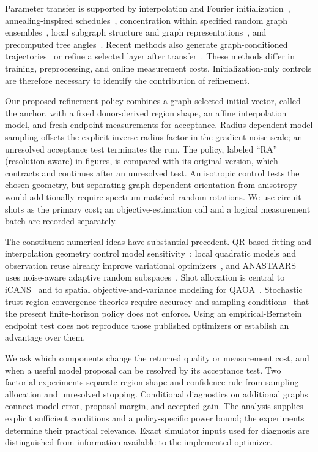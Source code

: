 \documentclass[11pt]{article}
\begin{document}
Parameter transfer is supported by interpolation and Fourier
initialization~\cite{zhou2020}, annealing-inspired schedules~\cite{sack2021},
concentration within specified random graph ensembles~\cite{brandao2018},
local subgraph structure and graph representations~\cite{galda2023,falla2024},
and precomputed tree angles~\cite{streif2020,wurtz2021}. Recent methods also
generate graph-conditioned trajectories~\cite{nguyen2026} or refine a
selected layer after transfer~\cite{patel2026}. These methods differ in
training, preprocessing, and online measurement costs. Initialization-only
controls are therefore necessary to identify the contribution of refinement.

Our proposed refinement policy combines a graph-selected initial vector,
called the anchor, with a fixed donor-derived region shape, an affine
interpolation model, and fresh endpoint measurements for acceptance.
Radius-dependent model sampling offsets the explicit inverse-radius factor
in the gradient-noise scale;
an unresolved acceptance test terminates the run. The policy, labeled
``RA'' (resolution-aware) in figures, is compared with its original version,
which contracts and continues after an unresolved test. An isotropic control
tests the chosen geometry, but separating graph-dependent orientation from
anisotropy would additionally require spectrum-matched random rotations.
We use circuit shots as the primary cost; an objective-estimation call and
a logical measurement batch are recorded separately.

The constituent numerical ideas have substantial precedent. QR-based
fitting and interpolation geometry control model
sensitivity~\cite{golub2013,conn2008}; local quadratic models and observation
reuse already improve variational optimizers~\cite{sung2020}, and ANASTAARS
uses noise-aware adaptive random subspaces~\cite{dzahini2025}. Shot allocation
is central to iCANS~\cite{kubler2020} and to spatial objective-and-variance
modeling for QAOA~\cite{ha2024}. Stochastic trust-region convergence theories
require accuracy and sampling conditions~\cite{chen2018,shashaani2018}
that the present finite-horizon policy does not enforce. Using an
empirical-Bernstein endpoint test does not reproduce those published
optimizers or establish an advantage over them.

We ask which components change the returned quality or measurement cost,
and when a useful model proposal can be resolved by its acceptance test.
Two factorial experiments separate region shape and confidence rule from
sampling allocation and unresolved stopping. Conditional diagnostics on
additional graphs connect model error, proposal margin, and accepted gain.
The analysis supplies explicit sufficient conditions and a policy-specific
power bound; the experiments determine their practical relevance. Exact
simulator inputs used for diagnosis are distinguished from information
available to the implemented optimizer.
\end{document}
